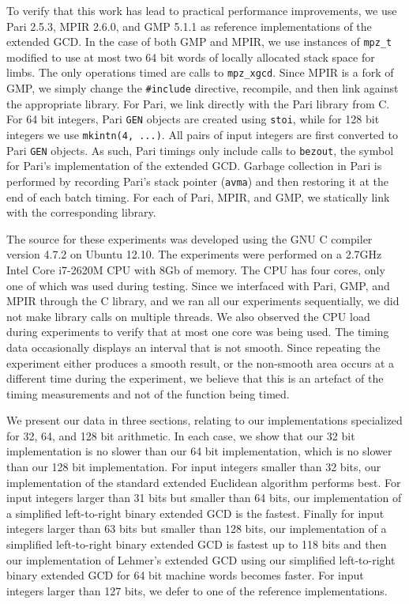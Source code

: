 \documentclass{ucalgthes1}
\theoremstyle{definition}
\newcommand{\compiler}{GNU C compiler version 4.7.2}
\newcommand{\cpu}{2.7GHz Intel Core i7-2620M CPU}
\newcommand{\GMP}{GMP 5.1.1}
\newcommand{\Pari}{Pari 2.5.3}
\newcommand{\MPIR}{MPIR 2.6.0}
\begin{document}
To verify that this work has lead to practical performance improvements, we use \Pari{}, \MPIR{}, and \GMP{} as reference implementations of the extended GCD.  In the case of both GMP and MPIR, we use instances of \texttt{mpz\_t} modified to use at most two 64 bit words of locally allocated stack space for limbs.  The only operations timed are calls to \texttt{mpz\_xgcd}.  Since MPIR is a fork of GMP, we simply change the \texttt{\#include} directive, recompile, and then link against the appropriate library.  For Pari, we link directly with the Pari library from C.  For 64 bit integers, Pari \texttt{GEN} objects are created using \texttt{stoi}, while for 128 bit integers we use \texttt{mkintn(4, ...)}.  All pairs of input integers are first converted to Pari \texttt{GEN} objects.  As such, Pari timings only include calls to \texttt{bezout}, the symbol for Pari's implementation of the extended GCD.  Garbage collection in Pari is performed by recording Pari's stack pointer (\texttt{avma}) and then restoring it at the end of each batch timing.  For each of Pari, MPIR, and GMP, we statically link with the corresponding library.

The source for these experiments was developed using the \compiler{} on Ubuntu 12.10.  The experiments were performed on a \cpu{} with 8Gb of memory.  The CPU has four cores, only one of which was used during testing.  Since we interfaced with Pari, GMP, and MPIR through the C library, and we ran all our experiments sequentially, we did not make library calls on multiple threads.  We also observed the CPU load during experiments to verify that at most one core was being used.  The timing data occasionally displays an interval that is not smooth.  Since repeating the experiment either produces a smooth result, or the non-smooth area occurs at a different time during the experiment, we believe that this is an artefact of the timing measurements and not of the function being timed.

We present our data in three sections, relating to our implementations specialized for 32, 64, and 128 bit arithmetic.  In each case, we show that our 32 bit implementation is no slower than our 64 bit implementation, which is no slower than our 128 bit implementation.  For input integers smaller than 32 bits, our implementation of the standard extended Euclidean algorithm performs best.  For input integers larger than 31 bits but smaller than 64 bits, our implementation of a simplified left-to-right binary extended GCD is the fastest.  Finally for input integers larger than 63 bits but smaller than 128 bits, our implementation of a simplified left-to-right binary extended GCD is fastest up to 118 bits and then our implementation of Lehmer's extended GCD using our simplified left-to-right binary extended GCD for 64 bit machine words becomes faster.  For input integers larger than 127 bits, we defer to one of the reference implementations.
\end{document}
